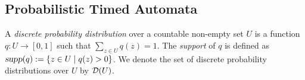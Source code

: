 \subsection{Probabilistic Timed Automata}

A \emph{discrete probability distribution} over a countable non-empty set $U$ is a function $q:U\rightarrow[0,1]$ such that $\sum_{z\in U}q(z)=1$.
The \emph{support} of $q$ is defined as ${\mbox{\sl supp}}(q):=\{z\in U\mid q(z)>0\}$.
We denote the set of discrete probability distributions over $U$ by ${\mathcal{D}}{\left(U\right)}$.

